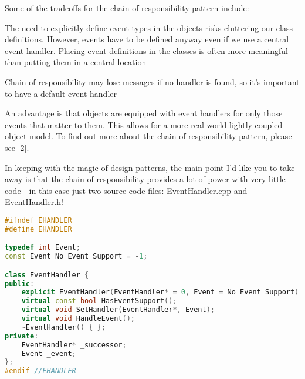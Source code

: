 \documentclass{book}
\begin{document}
Some of the tradeoffs for the chain of responsibility pattern include:

    The need to explicitly define event types in the objects risks cluttering our class definitions. However, events have to be defined anyway even if we use a central event handler.
    Placing event definitions in the classes is often more meaningful than putting them in a central location

    Chain of responsibility may lose messages if no handler is found, so it's important to have a default event handler

An advantage is that objects are equipped with event handlers for only those events that matter to them.
This allows for a more real world lightly coupled object model. To find out more about the chain of responsibility pattern, please see [2].

In keeping with the magic of design patterns, the main point I'd like you to take away is that the chain of 
responsibility provides a lot of power with very little code—in this case just two source code files: EventHandler.cpp and EventHandler.h! 

\begin{lstlisting}[caption={EventHandler.h}, language=C++]
#ifndef EHANDLER
#define EHANDLER

typedef int Event;
const Event No_Event_Support = -1;

class EventHandler {
public:
	explicit EventHandler(EventHandler* = 0, Event = No_Event_Support);
	virtual const bool HasEventSupport();
	virtual void SetHandler(EventHandler*, Event);
	virtual void HandleEvent();
	~EventHandler() { };
private:
	EventHandler* _successor;
	Event _event;
};
#endif //EHANDLER
\end{lstlisting}
\end{document}

